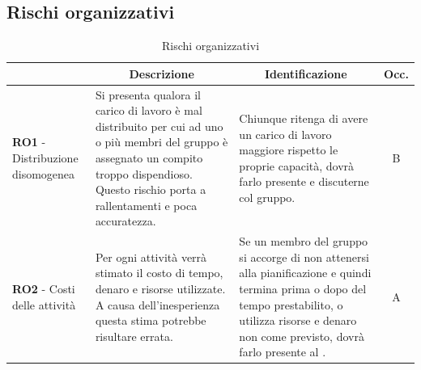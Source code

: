 \subsection{Rischi organizzativi} \label{subsection:rischi_organizzazione}
\begin{table}[H]
  \centering
  \renewcommand{\arraystretch}{1.8}
  \begin{tabular}{p{5.5cm}|p{5cm}|p{5cm}|c}
    \rowcolor[HTML]{125E28} 
    \multicolumn{1}{c}{\color[HTML]{FFFFFF}\textbf{Codice}}
    & \multicolumn{1}{c}{\color[HTML]{FFFFFF}\textbf{Descrizione}}
    & \multicolumn{1}{c}{\color[HTML]{FFFFFF}\textbf{Identificazione}}
    & \color[HTML]{FFFFFF}\textbf{Occ.}\\
    \hline
    \textbf{RO1} - Distribuzione disomogenea & Si presenta qualora il carico di lavoro è mal distribuito per cui ad uno o più membri del gruppo è assegnato un compito troppo dispendioso. Questo rischio porta a rallentamenti e poca accuratezza. & Chiunque ritenga di avere un carico di lavoro maggiore rispetto le proprie capacità, dovrà farlo presente e discuterne col gruppo. & B \\
    \textbf{RO2} - Costi delle attività & Per ogni attività verrà stimato il costo di tempo, denaro e risorse utilizzate. A causa dell'inesperienza questa stima potrebbe risultare errata. & Se un membro del gruppo si accorge di non attenersi alla pianificazione e quindi termina prima o dopo del tempo prestabilito, o utilizza risorse e denaro non come previsto, dovrà farlo presente al \roleProjectManagerLow{}. & A \\
  \end{tabular}
  \caption{Rischi organizzativi}
\end{table}


